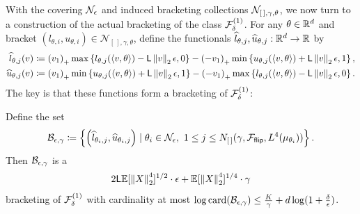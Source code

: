 With the covering $\mathcal{N}_\epsilon$ and induced bracketing collections
$\mathcal{N}_{[\,],\gamma,\theta}$, we now turn to a construction of the
actual bracketing of the class $\mathcal{F}_\delta^{(1)}$.
For any $\theta \in \mathbb{R}^d$ and bracket $(l_{\theta,i},
u_{\theta, i}) \in \mathcal{N}_{[\,], \gamma, \theta}$, define
the functionals $\widehat{l}_{\theta,j}, \widehat{u}_{\theta,j} : \mathbb{R}^d \to \mathbb{R}$ by
\begin{align*}
	\widehat{l}_{\theta, j}(v)
	& \coloneqq \left({v_1}\right)_+
	\max\left\{l_{\theta,j}(\langle v, \theta\rangle) - \mathsf{L} \left\|{v}\right\|_2 \epsilon,
	0 \right\}
	- \left({-v_1}\right)_+ \min\left\{u_{\theta, j}(\langle v, \theta\rangle) + \mathsf{L} \left\|{v}\right\|_2 \epsilon, 1
	\right\}  , \\
	\widehat{u}_{\theta, j}(v)
	& \coloneqq \left({v_1}\right)_+ \min\left\{u_{\theta, j}(\langle v, \theta\rangle)
	+ \mathsf{L} \left\|{v}\right\|_2 \epsilon, 1 \right\}
	- \left({-v_1}\right)_+ \max\left\{l_{\theta, j}(\langle v, \theta\rangle) -
	\mathsf{L} \left\|{v}\right\|_2 \epsilon, 0 \right\}.
\end{align*}
The key is that these functions form a bracketing
of $\mathcal{F}_\delta^{(1)}$:
\begin{lemma}
	\label{lemma:bracketing-construction}
	Define the set
	\begin{equation*}
		\mathcal{B}_{\epsilon,\gamma}
		\coloneqq
		\left\{ \left(\widehat{l}_{\theta_i, j},
		\widehat{u}_{\theta_i, j}\right)
		\mid
		\theta_i \in \mathcal{N}_\epsilon,
		~ 1 \le j \le N_{[\,]}(\gamma, \mathcal{F}_{\mathsf{flip}}, L^4(\mu_{\theta_i}))\right\}.
	\end{equation*}
	Then
	$\mathcal{B}_{\epsilon,\gamma}$ is a
	\begin{equation*}
		2 \mathsf{L} \mathbb{E}[\left\|{X}\right\|_2^4]^{1/2} \cdot \epsilon
		+ \mathbb{E}[\left\|{X}\right\|_2^4]^{1/4} \cdot \gamma
	\end{equation*}
	bracketing
	of $\mathcal{F}_\delta^{(1)}$ with cardinality
	at most
	$\log \textup{card}(\mathcal{B}_{\epsilon,\gamma})
	\le \frac{K}{\gamma} + d \log(1 + \frac{\delta}{\epsilon})$.
\end{lemma}
